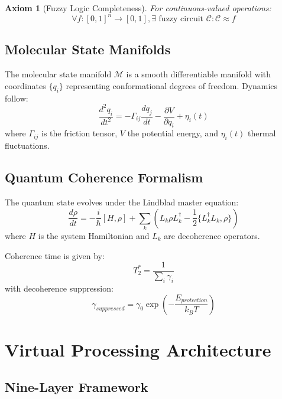 \documentclass[12pt]{article}
\newtheorem{axiom}[theorem]{Axiom}
\begin{document}
\begin{axiom}[Fuzzy Logic Completeness]
For continuous-valued operations:
\begin{equation}
\forall f: [0,1]^n \rightarrow [0,1], \exists \text{ fuzzy circuit } \mathcal{C}: \mathcal{C} \approx f
\end{equation}
\end{axiom}

\subsection{Molecular State Manifolds}

The molecular state manifold $\mathcal{M}$ is a smooth differentiable manifold with coordinates $\{q_i\}$ representing conformational degrees of freedom. Dynamics follow:
\begin{equation}
\frac{d^2 q_i}{dt^2} = -\Gamma_{ij} \frac{dq_j}{dt} - \frac{\partial V}{\partial q_i} + \eta_i(t)
\end{equation}
where $\Gamma_{ij}$ is the friction tensor, $V$ the potential energy, and $\eta_i(t)$ thermal fluctuations.

\subsection{Quantum Coherence Formalism}

The quantum state evolves under the Lindblad master equation:
\begin{equation}
\frac{d\rho}{dt} = -\frac{i}{\hbar}[H, \rho] + \sum_k \left( L_k \rho L_k^\dagger - \frac{1}{2}\{L_k^\dagger L_k, \rho\} \right)
\end{equation}
where $H$ is the system Hamiltonian and $L_k$ are decoherence operators.

Coherence time is given by:
\begin{equation}
T_2^* = \frac{1}{\sum_i \gamma_i}
\end{equation}
with decoherence suppression:
\begin{equation}
\gamma_{suppressed} = \gamma_0 \exp\left(-\frac{E_{protection}}{k_B T}\right)
\end{equation}

\section{Virtual Processing Architecture}

\subsection{Nine-Layer Framework}
\end{document}
